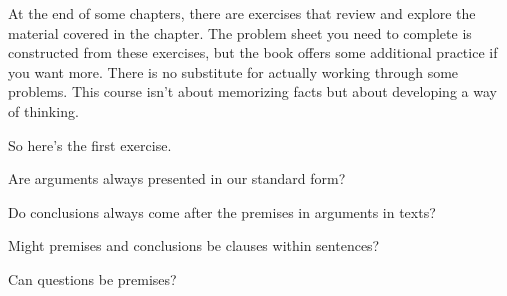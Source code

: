 \begin{practiceproblems}

At the end of some chapters, there are exercises that review and
explore the material covered in the chapter.
The problem sheet you need to complete is constructed from these exercises, but the book offers some additional practice if you want more.
There is no substitute for actually working through some problems. This course isn't about memorizing facts but about developing a way of thinking.

So here’s the first exercise.
\problempart

\begin{earg}
\item Are arguments always presented in our standard form?
\item Do conclusions always come after the premises in arguments in texts?
\item Might premises and conclusions be clauses within sentences?
\item Can questions be premises?
\end{earg}


\end{practiceproblems}
